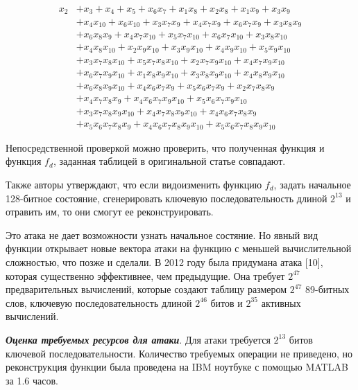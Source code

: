 \documentclass[colorthm]{./civarticle}
\begin{document}
    \begin{equation}
        \begin{aligned}
    x_2 & +x_3+x_4+x_5+x_6 x_7+x_1 x_8+x_2 x_8+x_1 x_9+x_3 x_9 \\
    & +x_4 x_{10}+x_6 x_{10}+x_3 x_7 x_9+x_4 x_7 x_9+x_6 x_7 x_9+x_3 x_8 x_9 \\
    & +x_6 x_8 x_9+x_4 x_7 x_{10}+x_5 x_7 x_{10}+x_6 x_7 x_{10}+x_3 x_8 x_{10} \\
    & +x_4 x_8 x_{10}+x_2 x_9 x_{10}+x_3 x_9 x_{10}+x_4 x_9 x_{10}+x_5 x_9 x_{10} \\
    & +x_3 x_7 x_8 x_{10}+x_5 x_7 x_8 x_{10}+x_2 x_7 x_9 x_{10}+x_4 x_7 x_9 x_{10} \\
    & +x_6 x_7 x_9 x_{10}+x_1 x_8 x_9 x_{10}+x_3 x_8 x_9 x_{10}+x_4 x_8 x_9 x_{10} \\
    & +x_6 x_8 x_9 x_{10}+x_4 x_6 x_7 x_9+x_5 x_6 x_7 x_9+x_2 x_7 x_8 x_9 \\
    & +x_4 x_7 x_8 x_9+x_4 x_6 x_7 x_9 x_{10}+x_5 x_6 x_7 x_9 x_{10} \\
    & +x_3 x_7 x_8 x_9 x_{10}+x_4 x_7 x_8 x_9 x_{10}+x_4 x_6 x_7 x_8 x_9 \\
    & +x_5 x_6 x_7 x_8 x_9+x_4 x_6 x_7 x_8 x_9 x_{10}+x_5 x_6 x_7 x_8 x_9 x_{10}
    \end{aligned}
    \end{equation}

    Непосредственной проверкой можно проверить, что полученная функция и функция $f_d$, заданная таблицей в оригинальной статье совпадают.

    Также авторы утверждают, что если видоизменить функцию $f_d$, задать начальное 128-битное состояние, сгенерировать ключевую последовательность длиной $2^{13}$ и отравить им, то они смогут ее реконструировать.

    Это атака не дает возможности узнать начальное состяние. Но явный вид функции открывает новые вектора атаки на функцию с меньшей вычислительной сложностью, что позже и сделали. В 2012 году была придумана атака [10], которая существенно эффективнее, чем предыдущие. Она требует $2^{47}$ предварительных вычислений, которые создают таблицу размером $2^{47}$ 89-битных слов, ключевую последовательность длиной $2^{46}$ битов  и $2^{35}$ активных вычислений. 

    \textbf{\emph{Оценка требуемых ресурсов для атаки}}. Для атаки требуется $2^{13}$ битов ключевой последовательности. Количество требуемых операции не приведено, но реконструкция функции была проведена на IBM ноутбуке с помощью MATLAB за 1.6 часов.
    
\end{document}
